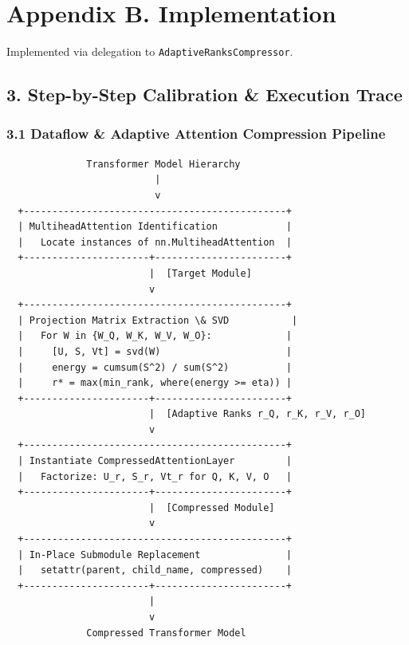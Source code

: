 \section*{Appendix B. Implementation}Implemented via delegation to \texttt{AdaptiveRanksCompressor}.



\subsection{3. Step-by-Step Calibration \& Execution Trace}
\subsubsection{3.1 Dataflow \& Adaptive Attention Compression Pipeline}


\begin{lstlisting}
              Transformer Model Hierarchy
                          |
                          v
  +----------------------------------------------+
  | MultiheadAttention Identification            |
  |   Locate instances of nn.MultiheadAttention  |
  +----------------------+-----------------------+
                         |  [Target Module]
                         v
  +----------------------------------------------+
  | Projection Matrix Extraction \& SVD           |
  |   For W in {W_Q, W_K, W_V, W_O}:             |
  |     [U, S, Vt] = svd(W)                      |
  |     energy = cumsum(S^2) / sum(S^2)          |
  |     r* = max(min_rank, where(energy >= eta)) |
  +----------------------+-----------------------+
                         |  [Adaptive Ranks r_Q, r_K, r_V, r_O]
                         v
  +----------------------------------------------+
  | Instantiate CompressedAttentionLayer         |
  |   Factorize: U_r, S_r, Vt_r for Q, K, V, O   |
  +----------------------+-----------------------+
                         |  [Compressed Module]
                         v
  +----------------------------------------------+
  | In-Place Submodule Replacement               |
  |   setattr(parent, child_name, compressed)    |
  +----------------------+-----------------------+
                         |
                         v
              Compressed Transformer Model
\end{lstlisting}


